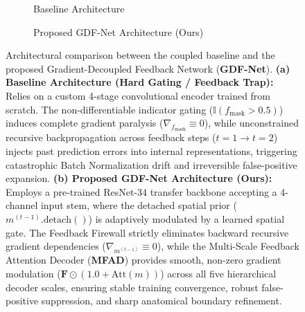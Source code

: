 \begin{figure}[t!]
\centering
\begin{subfigure}[b]{0.48\textwidth}
  \centering
  \caption{Baseline Architecture}
  \label{fig:arch_baseline}
\end{subfigure}
\hfill
\begin{subfigure}[b]{0.48\textwidth}
  \centering
  \caption{Proposed GDF-Net Architecture (Ours)}
  \label{fig:arch_proposed}
\end{subfigure}
\caption{Architectural comparison between the coupled baseline and the proposed Gradient-Decoupled Feedback Network (\textbf{GDF-Net}). \textbf{(a) Baseline Architecture (Hard Gating / Feedback Trap):} Relies on a custom 4-stage convolutional encoder trained from scratch. The non-differentiable indicator gating ($\mathbb{I}(f_{\text{mask}} > 0.5)$) induces complete gradient paralysis ($\nabla_{f_{\text{mask}}} \equiv 0$), while unconstrained recursive backpropagation across feedback steps ($t=1 \to t=2$) injects past prediction errors into internal representations, triggering catastrophic Batch Normalization drift and irreversible false-positive expansion. \textbf{(b) Proposed GDF-Net Architecture (Ours):} Employs a pre-trained ResNet-34 transfer backbone accepting a 4-channel input stem, where the detached spatial prior ($m^{(t-1)}.\text{detach}()$) is adaptively modulated by a learned spatial gate. The Feedback Firewall strictly eliminates backward recursive gradient dependencies ($\nabla_{m^{(t-1)}} \equiv 0$), while the Multi-Scale Feedback Attention Decoder (\textbf{MFAD}) provides smooth, non-zero gradient modulation ($\mathbf{F} \odot (1.0 + \text{Att}(m))$) across all five hierarchical decoder scales, ensuring stable training convergence, robust false-positive suppression, and sharp anatomical boundary refinement.}
\label{fig:architecture}
\label{fig:architecture_diagram}
\end{figure}
